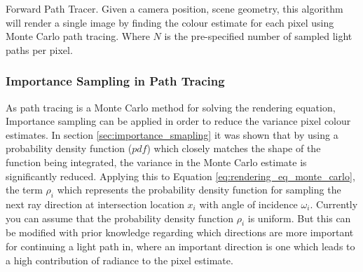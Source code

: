 \documentclass[../dissertation.tex]{subfiles}
\begin{document}
\begin{algorithm}[H]
\label{alg:forward_path_tracing}
\SetAlgoLined
 \caption{Forward Path Tracer. Given a camera position, scene geometry, this algorithm will render a single image by finding the colour estimate for each pixel using Monte Carlo path tracing. Where $N$ is the pre-specified number of sampled light paths per pixel.}
\end{algorithm}


\subsubsection{Importance Sampling in Path Tracing}

As path tracing is a Monte Carlo method for solving the rendering equation, Importance sampling can be applied in order to reduce the variance pixel colour estimates. In section \ref{sec:importance_smapling} it was shown that by using a probability density function ($pdf$) which closely matches the shape of the function being integrated, the variance in the Monte Carlo estimate is significantly reduced. Applying this to Equation \ref{eq:rendering_eq_monte_carlo}, the term $\rho_i$ which represents the probability density function for sampling the next ray direction at intersection location $x_i$ with angle of incidence $\omega_i$. Currently you can assume that the probability density function $\rho_i$ is uniform. But this can be modified with prior knowledge regarding which directions are more important for continuing a light path in, where an important direction is one which leads to a high contribution of radiance to the pixel estimate.\\
\end{document}
